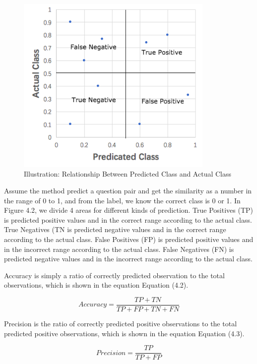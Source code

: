 	\begin{figure}[!h]
		\centering
		\includegraphics[width = 0.85\textwidth]{figures/class.png}
		\caption{Illustration: Relationship Between Predicted Class and Actual Class}
	\end{figure}
	Assume the method predict a question pair and get the similarity as a number in the range of 0 to 1, and from the label, we know the correct class is 0 or 1. In Figure 4.2, we divide 4 areas for different kinds of prediction. True Positives (TP) is predicted positive values and in the correct range according to the actual class. True Negatives (TN is predicted negative values and in the correct range according to the actual class. False Positives (FP) is predicted positive values and in the incorrect range according to the actual class. False Negatives (FN) is predicted negative values and in the incorrect range according to the actual class.
	\par
	Accuracy is simply a ratio of correctly predicted observation to the total observations, which is shown in the equation Equation (4.2).
	\begin{normalsize}
		\begin{equation}
		Accuracy =  \frac{TP+TN}{TP+FP+TN+FN}
		\end{equation}
	\end{normalsize}
	\par
	Precision is the ratio of correctly predicted positive observations to the total predicted positive observations, which is shown in the equation Equation (4.3).
	\begin{normalsize}
		\begin{equation}
		Precision =  \frac{TP}{TP+FP}
		\end{equation}
	\end{normalsize}
